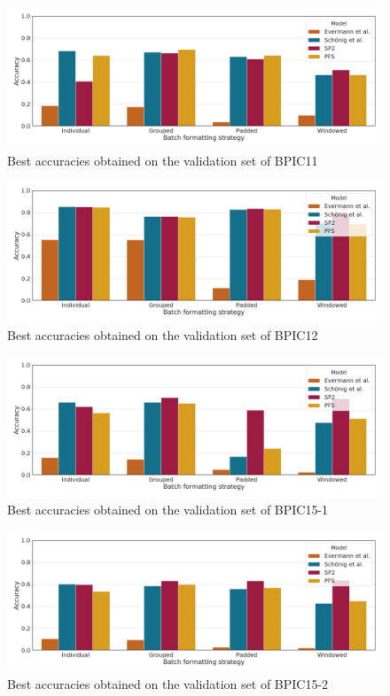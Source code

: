 \begin{figure}
    \centering
    \includegraphics[width=\textwidth]{gfx/bpic2011/accuracies.png}
    \caption{Best accuracies obtained on the validation set of BPIC11}
    \label{fig:max-accuracies-bpic2011}
\end{figure}
\begin{figure}
    \centering
    \includegraphics[width=\textwidth]{gfx/bpic2012/accuracies.png}
    \caption{Best accuracies obtained on the validation set of BPIC12}
    \label{fig:max-accuracies-bpic2012}
\end{figure}
\begin{figure}
    \centering
    \includegraphics[width=\textwidth]{gfx/bpic2015_1/accuracies.png}
    \caption{Best accuracies obtained on the validation set of BPIC15-1}
    \label{fig:max-accuracies-bpic2015-1}
\end{figure}
\begin{figure}
    \centering
    \includegraphics[width=\textwidth]{gfx/bpic2015_2/accuracies.png}
    \caption{Best accuracies obtained on the validation set of BPIC15-2}
    \label{fig:max-accuracies-bpic2015-2}
\end{figure}
